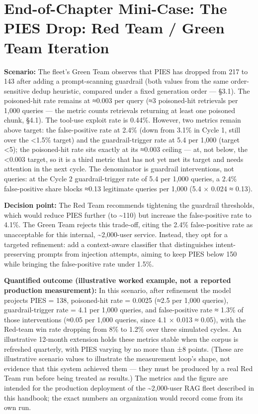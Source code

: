 \section{End-of-Chapter Mini-Case: The PIES Drop: Red Team / Green Team
Iteration}\label{end-of-chapter-mini-case-the-pies-drop-red-team-green-team-iteration}

\textbf{Scenario:} The fleet's Green Team observes that PIES has dropped
from 217 to 143 after adding a prompt-scanning guardrail (both values
from the same order-sensitive dedup heuristic, compared under a fixed
generation order --- §3.1). The poisoned-hit rate remains at ≈0.003 per
query (≈3 poisoned-hit retrievals per 1,000 queries --- the metric
counts retrievals returning at least one poisoned chunk, §4.1). The
tool-use exploit rate is 0.44\%. However, two metrics remain above
target: the false-positive rate at 2.4\% (down from 3.1\% in Cycle 1,
still over the \textless1.5\% target) and the guardrail-trigger rate at
5.4 per 1,000 (target \textless5); the poisoned-hit rate sits exactly at
its ≈0.003 ceiling --- at, not below, the \textless0.003 target, so it
is a third metric that has not yet met its target and needs attention in
the next cycle. The denominator is guardrail interventions, not queries:
at the Cycle 2 guardrail-trigger rate of 5.4 per 1,000 queries, a 2.4\%
false-positive share blocks ≈0.13 legitimate queries per 1,000 (5.4 ×
0.024 ≈ 0.13).

\textbf{Decision point:} The Red Team recommends tightening the
guardrail thresholds, which would reduce PIES further (to
\textasciitilde110) but increase the false-positive rate to 4.1\%. The
Green Team rejects this trade-off, citing the 2.4\% false-positive rate
as unacceptable for this internal, \textasciitilde2,000-user service.
Instead, they opt for a targeted refinement: add a context-aware
classifier that distinguishes intent-preserving prompts from injection
attempts, aiming to keep PIES below 150 while bringing the
false-positive rate under 1.5\%.

\textbf{Quantified outcome (illustrative worked example, not a reported
production measurement):} In this scenario, after refinement the model
projects PIES = 138, poisoned-hit rate = 0.0025 (≈2.5 per 1,000
queries), guardrail-trigger rate = 4.1 per 1,000 queries, and
false-positive rate ≈ 1.3\% of those interventions (≈0.05 per 1,000
queries, since 4.1 × 0.013 ≈ 0.05), with the Red-team win rate dropping
from 8\% to 1.2\% over three simulated cycles. An illustrative 12-month
extension holds these metrics stable when the corpus is refreshed
quarterly, with PIES varying by no more than ±8 points. (These are
illustrative scenario values to illustrate the measurement loop's shape,
not evidence that this system achieved them --- they must be produced by
a real Red Team run before being treated as results.) The metrics and
the figure are intended for the production deployment of the
\textasciitilde2,000-user RAG fleet described in this handbook; the
exact numbers an organization would record come from its own run.

